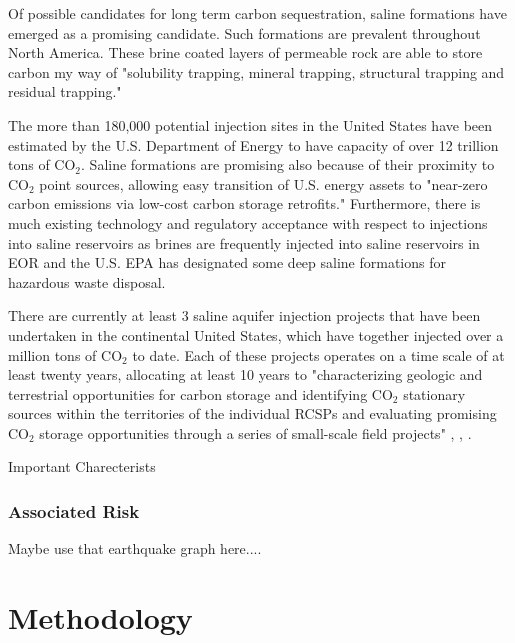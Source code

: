 \documentclass[letterpaper, 12pt]{article}
\begin{document}
\par Of possible candidates for long term carbon sequestration, saline formations have emerged as a promising candidate. Such formations are prevalent throughout North America. These brine coated layers of permeable rock are able to store carbon my way of "solubility trapping, mineral trapping, structural trapping and residual trapping."

The more than 180,000 potential injection sites in the United States have been estimated by the U.S. Department of Energy to have capacity of over 12 trillion tons of CO$_2$. Saline formations are promising also because of their proximity to CO$_2$ point sources, allowing easy transition of U.S. energy assets to "near-zero carbon emissions via low-cost carbon storage retrofits." \cite{whysaline} Furthermore, there is much existing technology and regulatory acceptance with respect to injections into saline reservoirs as brines are frequently injected into saline reservoirs in EOR and the U.S. EPA has designated some deep saline formations for hazardous waste disposal.

\par There are currently at least 3 saline aquifer injection projects that have been undertaken in the continental United States, which have together injected over a million tons of CO$_2$ to date. Each of these projects operates on a time scale of at least twenty years, allocating at least 10 years to "characterizing geologic and terrestrial opportunities for carbon storage and identifying CO$_2$ stationary sources within the territories of the individual RCSPs and evaluating promising CO$_2$ storage opportunities through a series of small-scale field projects"  \cite{midwestinject}, \cite{midwestinject2}, \cite{southeastinject}. 

Important Charecterists 



\subsubsection{Associated Risk} 
Maybe use that earthquake graph here....

\section{Methodology}
\end{document}
